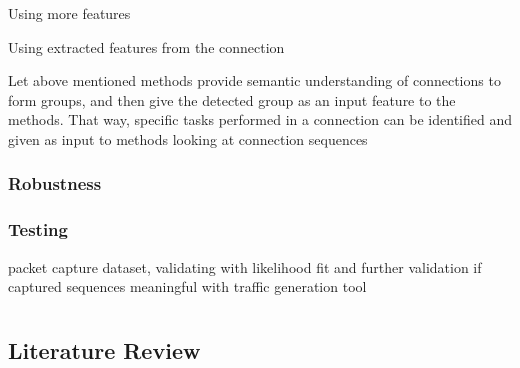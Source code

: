 \documentclass[a4paper,12pt,twoside]{report}
\begin{document}
Using more features

Using extracted features from the connection

Let above mentioned methods provide semantic understanding of connections to form groups, and then give the detected group as an input feature to the methods. That way, specific tasks performed in a connection can be identified and given as input to methods looking at connection sequences


\subsection{Robustness}\label{Robustness}

\subsection{Testing}

packet capture dataset, validating with likelihood fit and further validation if captured sequences meaningful with traffic generation tool


\appendix
\chapter{}
\section{Literature Review}\label{litreview}



\end{document}
